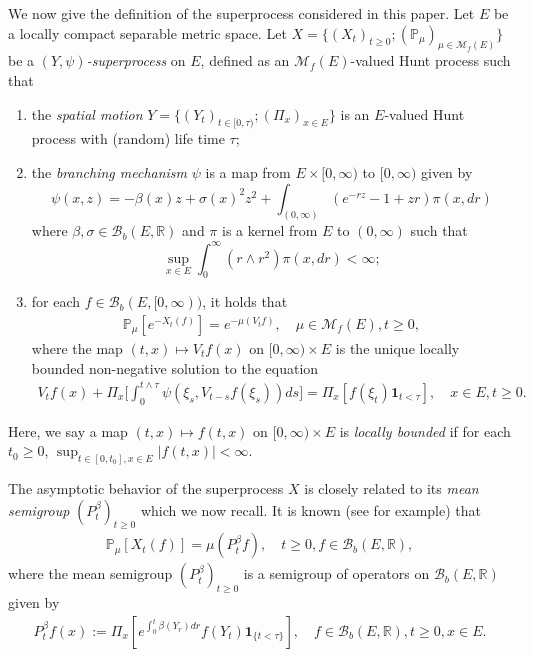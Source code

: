 \documentclass[12pt,a4paper]{amsart}
\numberwithin{equation}{section}
\theoremstyle{plain}
\theoremstyle{definition}
\theoremstyle{remark}
\begin{document}
We now give the definition of the superprocess considered in this paper. Let $E$ be a locally compact separable metric space. Let $X= \{(X_t)_{t\geq 0}; (\mathbb P_\mu)_{\mu\in \mathcal M_f(E)}\}$ be a \emph{$(Y,\psi)$-superprocess} on $E$, defined as an $\mathcal M_f(E)$-valued Hunt process such that
\begin{enumerate}
\item the \emph{spatial motion} $Y=\{(Y_t)_{t \in [0,\tau)};(\Pi_x)_{x\in E}\}$ is an $E$-valued Hunt process with (random) life time $\tau$;
\item the \emph{branching mechanism} $\psi$ is a map from $E\times[0,\infty)$ to $[0,\infty)$ given by
\[    
\psi(x,z)
    =-\beta(x)z + \sigma(x)^2 z^2+ \int_{(0,\infty)} (e^{-rz}-1+zr ) \pi(x, dr)
  \]
  where $\beta, \sigma\in \mathcal B_b(E,\mathbb R)$ and $\pi$ is a kernel from $E$ to $(0,\infty)$ such that
  \[
    \sup_{x\in E}\int_0^\infty (r\wedge r^2)\pi(x,dr)
    <\infty;
  \]
\item for each $f\in \mathcal B_b(E,[0,\infty))$, it holds that
  \begin{align}
    \label{eq:IR0}
    \mathbb P_\mu [e^{- X_t(f)}] = e^{-\mu(V_tf)},
    \quad \mu \in \mathcal M_f(E),t\geq 0,
  \end{align}
  where the map $(t,x) \mapsto V_tf(x)$ on $[0,\infty) \times E$ is the unique locally bounded non-negative solution to the equation
  \begin{align}
    V_t f(x) +   \Pi_x\Big[\int_0^{t\wedge \tau} \psi (\xi_s,V_{t-s} f(\xi_s)) ds\Big]
    = \Pi_x[f(\xi_t) \mathbf 1_{t < \tau}],
    \quad x \in E, t \geq 0.
  \end{align}
\end{enumerate}
Here, we say a map $(t,x) \mapsto f(t,x)$ on $[0,\infty)\times E$ is \emph{locally bounded} if for each $t_0 \geq 0$, $\sup_{t\in [0,t_0], x\in E} |f(t,x)| < \infty$.

The asymptotic behavior of the superprocess $X$ is closely related to its \emph{mean semigroup} $(P_t^\beta)_{t\geq 0}$ which we now recall. It is known (see \cite[Proposition 2.27]{Li2011MeasureValued} for example) that
\begin{align} 
  \label{eq:IR1}
\mathbb P_\mu [X_t(f)] = \mu(P^\beta_t f), 
\quad t \geq 0, f\in \mathcal B_b(E, \mathbb R),
\end{align} 
where the mean semigroup $(P_t^\beta)_{t\geq 0}$ is a semigroup of operators on $\mathcal B_b(E, \mathbb R)$ given by
\begin{align}
P^\beta_tf(x)
:= \Pi_x [e^{\int_0^{t} \beta(Y_r)dr} f(Y_t)\mathbf 1_{\{t<\tau\}}],
\quad f \in \mathcal B_b(E, \mathbb R),t\geq 0, x\in E.
\end{align}
\end{document}
